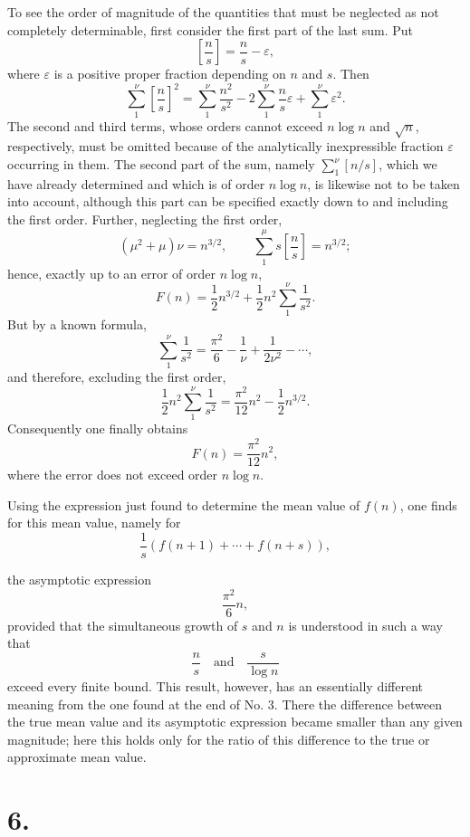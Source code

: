 \documentclass[11pt]{article}
\newcommand{\floor}[1]{\left[#1\right]}
\begin{document}
To see the order of magnitude of the quantities that must be neglected as not completely determinable, first consider the first part of the last sum. Put
\[
 \floor{\frac ns}=\frac ns-\varepsilon,
\]
where $\varepsilon$ is a positive proper fraction depending on $n$ and $s$. Then
\[
 \sum_{1}^{\nu}\floor{\frac ns}^{2}=
 \sum_{1}^{\nu}\frac{n^2}{s^2}-2\sum_{1}^{\nu}\frac ns\varepsilon+
 \sum_{1}^{\nu}\varepsilon^2.
\]
The second and third terms, whose orders cannot exceed $n\log n$ and $\sqrt n$, respectively, must be omitted because of the analytically inexpressible fraction $\varepsilon$ occurring in them. The second part of the sum, namely $\sum_1^{\nu}\floor{n/s}$, which we have already determined and which is of order $n\log n$, is likewise not to be taken into account, although this part can be specified exactly down to and including the first order. Further, neglecting the first order,
\[
 (\mu^2+\mu)\nu=n^{3/2},\qquad
 \sum_{1}^{\mu}s\floor{\frac ns}=n^{3/2};
\]
hence, exactly up to an error of order $n\log n$,
\[
 F(n)=\frac12 n^{3/2}+\frac12 n^2\sum_{1}^{\nu}\frac1{s^2}.
\]
But by a known formula,
\[
 \sum_{1}^{\nu}\frac1{s^2}=\frac{\pi^2}{6}-\frac1\nu+\frac{1}{2\nu^2}-\cdots,
\]
and therefore, excluding the first order,
\[
 \frac12 n^2\sum_{1}^{\nu}\frac1{s^2}=\frac{\pi^2}{12}n^2-\frac12 n^{3/2}.
\]
Consequently one finally obtains
\[
 F(n)=\frac{\pi^2}{12}n^2,
\]
where the error does not exceed order $n\log n$.

Using the expression just found to determine the mean value of $f(n)$, one finds for this mean value, namely for
\[
 \frac1s\left(f(n+1)+\cdots+f(n+s)\right),
\]

the asymptotic expression
\[
 \frac{\pi^2}{6}n,
\]
provided that the simultaneous growth of $s$ and $n$ is understood in such a way that
\[
 \frac ns\quad \text{and}\quad \frac{s}{\log n}
\]
exceed every finite bound. This result, however, has an essentially different meaning from the one found at the end of No. 3. There the difference between the true mean value and its asymptotic expression became smaller than any given magnitude; here this holds only for the ratio of this difference to the true or approximate mean value.

\section*{6.}
\end{document}

